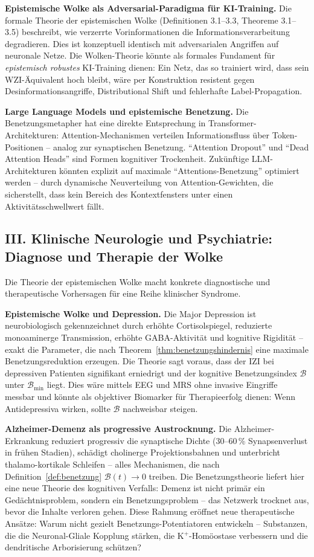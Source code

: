 ﻿\documentclass[12pt,a4paper]{report}
\theoremstyle{plain}
\theoremstyle{definition}
\theoremstyle{remark}
\begin{document}
	\textbf{Epistemische Wolke als Adversarial-Paradigma für KI-Training.}
	Die formale Theorie der epistemischen Wolke (Definitionen 3.1--3.3,
	Theoreme 3.1--3.5) beschreibt, wie verzerrte Vorinformationen
	die Informationsverarbeitung degradieren.
	Dies ist konzeptuell identisch mit adversarialen Angriffen auf
	neuronale Netze. Die Wolken-Theorie könnte als formales Fundament
	für \emph{epistemisch robustes} KI-Training dienen:
	Ein Netz, das so trainiert wird, dass sein WZI-Äquivalent
	hoch bleibt, wäre per Konstruktion resistent gegen
	Desinformationsangriffe, Distributional Shift und
	fehlerhafte Label-Propagation.

	\textbf{Large Language Models und epistemische Benetzung.}
	Die Benetzungsmetapher hat eine direkte Entsprechung in
	Transformer-Architekturen: Attention-Mechanismen verteilen
	Informationsfluss über Token-Positionen -- analog zur
	synaptischen Benetzung. ``Attention Dropout'' und
	``Dead Attention Heads'' sind Formen kognitiver Trockenheit.
	Zukünftige LLM-Architekturen könnten explizit auf
	maximale ``Attentions-Benetzung'' optimiert werden --
	durch dynamische Neuverteilung von Attention-Gewichten,
	die sicherstellt, dass kein Bereich des Kontextfensters
	unter einen Aktivitätsschwellwert fällt.

	\subsection*{III. Klinische Neurologie und Psychiatrie:
		Diagnose und Therapie der Wolke}

	Die Theorie der epistemischen Wolke macht konkrete diagnostische
	und therapeutische Vorhersagen für eine Reihe klinischer Syndrome.

	\textbf{Epistemische Wolke und Depression.}
	Die Major Depression ist neurobiologisch gekennzeichnet durch
	erhöhte Cortisolspiegel, reduzierte monoaminerge Transmission,
	erhöhte GABA-Aktivität und kognitive Rigidität --
	exakt die Parameter, die nach Theorem~\ref{thm:benetzungshindernis}
	eine maximale Benetzungsreduktion erzeugen.
	Die Theorie sagt voraus, dass der IZI bei depressiven Patienten
	signifikant erniedrigt und der kognitive Benetzungsindex $\mathcal{B}$
	unter $\mathcal{B}_{\min}$ liegt.
	Dies wäre mittels EEG und MRS ohne invasive Eingriffe messbar
	und könnte als objektiver Biomarker für Therapieerfolg dienen:
	Wenn Antidepressiva wirken, sollte $\mathcal{B}$ nachweisbar steigen.

	\textbf{Alzheimer-Demenz als progressive Austrocknung.}
	Die Alzheimer-Erkrankung reduziert progressiv die synaptische Dichte
	(30--60\,\% Synapsenverlust in frühen Stadien), schädigt
	cholinerge Projektionsbahnen und unterbricht thalamo-kortikale
	Schleifen -- alles Mechanismen, die nach Definition~\ref{def:benetzung}
	$\mathcal{B}(t) \to 0$ treiben.
	Die Benetzungstheorie liefert hier eine neue Theorie des
	kognitiven Verfalls: Demenz ist nicht primär ein Gedächtnisproblem,
	sondern ein Benetzungsproblem -- das Netzwerk trocknet aus,
	bevor die Inhalte verloren gehen.
	Diese Rahmung eröffnet neue therapeutische Ansätze:
	Warum nicht gezielt Benetzungs-Potentiatoren entwickeln --
	Substanzen, die die Neuronal-Gliale Kopplung stärken,
	die K$^+$-Homöostase verbessern und die dendritische
	Arborisierung schützen?
\end{document}
